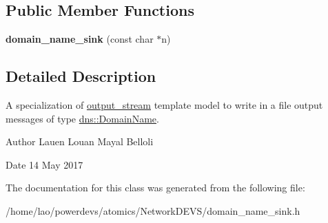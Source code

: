 \subsection*{Public Member Functions}
\begin{DoxyCompactItemize}
\item 
{\bfseries domain\+\_\+name\+\_\+sink} (const char $\ast$n)\hypertarget{classdomain__name__sink_a3e4a6071da63647e596cbe5b855d386d}{}\label{classdomain__name__sink_a3e4a6071da63647e596cbe5b855d386d}

\end{DoxyCompactItemize}


\subsection{Detailed Description}
A specialization of \hyperlink{classoutput__stream}{output\+\_\+stream} template model to write in a file output messages of type \hyperlink{structdns_1_1DomainName}{dns\+::\+Domain\+Name}. 

\begin{DoxyAuthor}{Author}
Lauen Louan Mayal Belloli 
\end{DoxyAuthor}
\begin{DoxyDate}{Date}
14 May 2017 
\end{DoxyDate}


The documentation for this class was generated from the following file\+:\begin{DoxyCompactItemize}
\item 
/home/lao/powerdevs/atomics/\+Network\+D\+E\+V\+S/domain\+\_\+name\+\_\+sink.\+h\end{DoxyCompactItemize}
